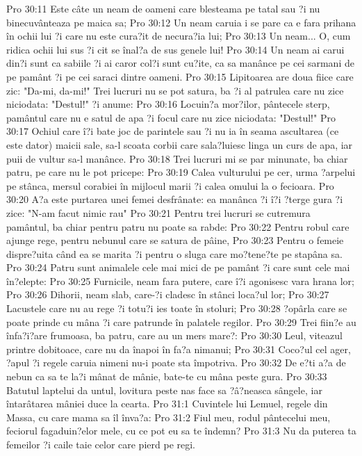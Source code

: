 Pro 30:11  Este câte un neam de oameni care blesteama pe tatal sau ?i nu binecuvânteaza pe maica sa;
Pro 30:12  Un neam caruia i se pare ca e fara prihana în ochii lui ?i care nu este cura?it de necura?ia lui;
Pro 30:13  Un neam... O, cum ridica ochii lui sus ?i cit se înal?a de sus genele lui!
Pro 30:14  Un neam ai carui din?i sunt ca sabiile ?i ai caror col?i sunt cu?ite, ca sa manânce pe cei sarmani de pe pamânt ?i pe cei saraci dintre oameni.
Pro 30:15  Lipitoarea are doua fiice care zic: "Da-mi, da-mi!" Trei lucruri nu se pot satura, ba ?i al patrulea care nu zice niciodata: "Destul!" ?i anume:
Pro 30:16  Locuin?a mor?ilor, pântecele sterp, pamântul care nu e satul de apa ?i focul care nu zice niciodata: "Destul!"
Pro 30:17  Ochiul care î?i bate joc de parintele sau ?i nu ia în seama ascultarea (ce este dator) maicii sale, sa-l scoata corbii care sala?luiesc linga un curs de apa, iar puii de vultur sa-l manânce.
Pro 30:18  Trei lucruri mi se par minunate, ba chiar patru, pe care nu le pot pricepe:
Pro 30:19  Calea vulturului pe cer, urma ?arpelui pe stânca, mersul corabiei în mijlocul marii ?i calea omului la o fecioara.
Pro 30:20  A?a este purtarea unei femei desfrânate: ea manânca ?i î?i ?terge gura ?i zice: "N-am facut nimic rau"
Pro 30:21  Pentru trei lucruri se cutremura pamântul, ba chiar pentru patru nu poate sa rabde:
Pro 30:22  Pentru robul care ajunge rege, pentru nebunul care se satura de pâine,
Pro 30:23  Pentru o femeie dispre?uita când ea se marita ?i pentru o sluga care mo?tene?te pe stapâna sa.
Pro 30:24  Patru sunt animalele cele mai mici de pe pamânt ?i care sunt cele mai în?elepte:
Pro 30:25  Furnicile, neam fara putere, care î?i agonisesc vara hrana lor;
Pro 30:26  Dihorii, neam slab, care-?i cladesc în stânci loca?ul lor;
Pro 30:27  Lacustele care nu au rege ?i totu?i ies toate în stoluri;
Pro 30:28  ?opârla care se poate prinde cu mâna ?i care patrunde în palatele regilor.
Pro 30:29  Trei fiin?e au înfa?i?are frumoasa, ba patru, care au un mers mare?:
Pro 30:30  Leul, viteazul printre dobitoace, care nu da înapoi în fa?a nimanui;
Pro 30:31  Coco?ul cel ager, ?apul ?i regele caruia nimeni nu-i poate sta împotriva.
Pro 30:32  De e?ti a?a de nebun ca sa te la?i mânat de mânie, bate-te cu mâna peste gura.
Pro 30:33  Batutul laptelui da untul, lovitura peste nas face sa ?â?neasca sângele, iar întarâtarea mâniei duce la cearta.
Pro 31:1  Cuvintele lui Lemuel, regele din Massa, cu care mama sa îl înva?a:
Pro 31:2  Fiul meu, rodul pântecelui meu, feciorul fagaduin?elor mele, cu ce pot eu sa te îndemn?
Pro 31:3  Nu da puterea ta femeilor ?i caile taie celor care pierd pe regi.
